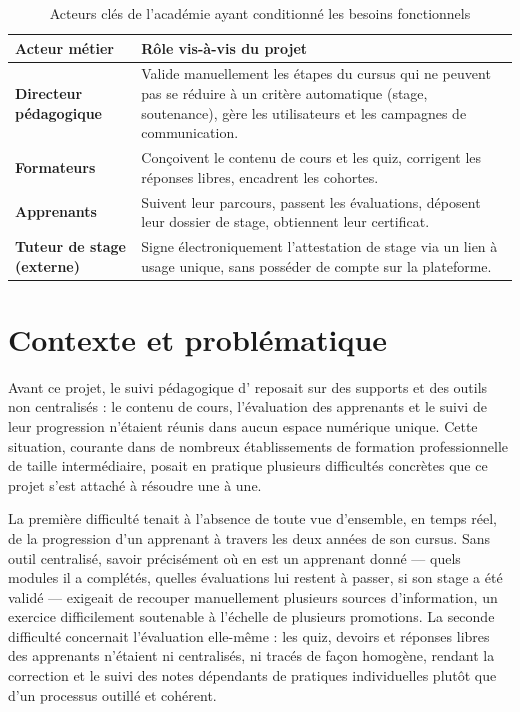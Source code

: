 \begin{table}[H]
\centering
\begin{tabular}{|>{\bfseries}p{4cm}|p{9.5cm}|}
\toprule
Acteur métier & Rôle vis-à-vis du projet \\
\midrule
Directeur pédagogique & Valide manuellement les étapes du cursus qui ne
  peuvent pas se réduire à un critère automatique (stage, soutenance),
  gère les utilisateurs et les campagnes de communication. \\ \hline
Formateurs & Conçoivent le contenu de cours et les quiz, corrigent les
  réponses libres, encadrent les cohortes. \\ \hline
Apprenants & Suivent leur parcours, passent les évaluations, déposent
  leur dossier de stage, obtiennent leur certificat. \\ \hline
Tuteur de stage (externe) & Signe électroniquement l'attestation de stage
  via un lien à usage unique, sans posséder de compte sur la plateforme. \\
\bottomrule
\end{tabular}
\caption{Acteurs clés de l'académie ayant conditionné les besoins fonctionnels}
\label{tab:acteurs-academie}
\end{table}

\section{Contexte et problématique}

Avant ce projet, le suivi pédagogique d'\Entreprise{} reposait sur des
supports et des outils non centralisés : le contenu de cours, l'évaluation
des apprenants et le suivi de leur progression n'étaient réunis dans aucun
espace numérique unique. Cette situation, courante dans de nombreux
établissements de formation professionnelle de taille intermédiaire,
posait en pratique plusieurs difficultés concrètes que ce projet s'est
attaché à résoudre une à une.

La première difficulté tenait à l'absence de toute vue d'ensemble, en
temps réel, de la progression d'un apprenant à travers les deux années de
son cursus. Sans outil centralisé, savoir précisément où en est un
apprenant donné --- quels modules il a complétés, quelles évaluations lui
restent à passer, si son stage a été validé --- exigeait de recouper
manuellement plusieurs sources d'information, un exercice difficilement
soutenable à l'échelle de plusieurs promotions. La seconde difficulté
concernait l'évaluation elle-même : les quiz, devoirs et réponses libres
des apprenants n'étaient ni centralisés, ni tracés de façon homogène,
rendant la correction et le suivi des notes dépendants de pratiques
individuelles plutôt que d'un processus outillé et cohérent.

